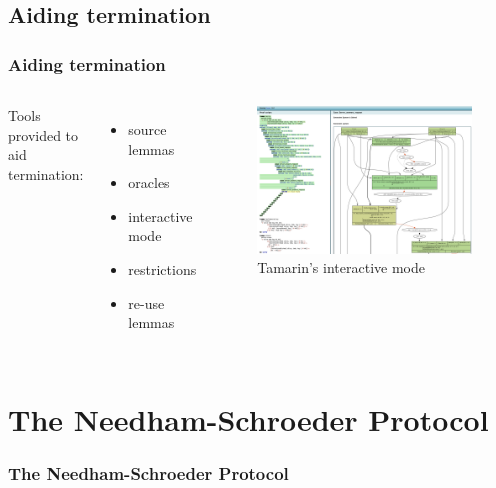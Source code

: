 \documentclass[aspectratio=169,t,xcolor=table]{beamer}
\begin{document}
\subsection{Aiding termination}
\begin{frame}
    \frametitle{Aiding termination}
    \begin{columns}
        Tools provided to aid termination:
        \begin{itemize}
            \item source lemmas
            \item oracles
            \item interactive mode
            \item restrictions
            \item re-use lemmas
        \end{itemize}
        \begin{figure}
            \centering
            \includegraphics[width=.9\textwidth]{images/gui.png}
            \caption{Tamarin's interactive mode}
        \end{figure}
    \end{columns}
\end{frame}

\section{The Needham-Schroeder Protocol}

\begin{frame}{}
    \frametitle{The Needham-Schroeder Protocol}
\end{frame}
\end{document}
